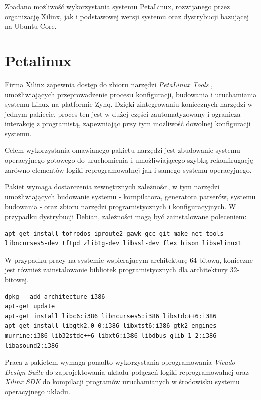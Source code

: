 Zbadano możliwość wykorzystania systemu PetaLinux, rozwijanego przez organizację Xilinx, jak i podstawowej wersji systemu oraz dystrybucji bazującej na Ubuntu Core.

\section{Petalinux}
Firma Xilinx zapewnia dostęp do zbioru narzędzi \emph{PetaLinux Tools} \cite{petalinux-tools}, umożliwiających przeprowadzenie procesu konfiguracji, budowania i uruchamiania systemu Linux na platformie Zynq. Dzięki zintegrowaniu koniecznych narzędzi w jednym pakiecie, proces ten jest w dużej części zautomatyzowany i ogranicza interakcję z programistą, zapewniając przy tym możliwość dowolnej konfiguracji systemu.

Celem wykorzystania omawianego pakietu narzędzi jest zbudowanie systemu operacyjnego gotowego do uruchomienia i umożliwiającego szybką rekonfirugację zarówno elementów logiki reprogramowalnej jak i samego systemu operacyjnego.

Pakiet wymaga dostarczenia zewnętrznych zależności, w tym narzędzi umożliwiających budowanie systemu - kompilatora, generatora parserów, systemu budowania - oraz zbioru narzędzi programistycznych i konfiguracyjnych.
W przypadku dystrybucji Debian, zależności mogą być zainstalowane poleceniem:

\begin{lstlisting}[breaklines=true]
apt-get install tofrodos iproute2 gawk gcc git make net-tools libncurses5-dev tftpd zlib1g-dev libssl-dev flex bison libselinux1
\end{lstlisting}

W przypadku pracy na systemie wspierającym architekturę 64-bitową, konieczne jest również zainstalowanie bibliotek programistycznych dla architektury 32-bitowej.

\begin{lstlisting}[breaklines=true]
dpkg --add-architecture i386
apt-get update
apt-get install libc6:i386 libncurses5:i386 libstdc++6:i386
apt-get install libgtk2.0-0:i386 libxtst6:i386 gtk2-engines-murrine:i386 lib32stdc++6 libxt6:i386 libdbus-glib-1-2:i386 libasound2:i386
\end{lstlisting}

Praca z pakietem wymaga ponadto wykorzystania oprogramowania \emph{Vivado Design Suite} \cite{vivado-home} do zaprojektowania układu połączeń logiki reprogramowalnej oraz \emph{Xilinx SDK} \cite{xsdk-home} do kompilacji programów uruchamianych w środowisku systemu operacyjnego układu.

